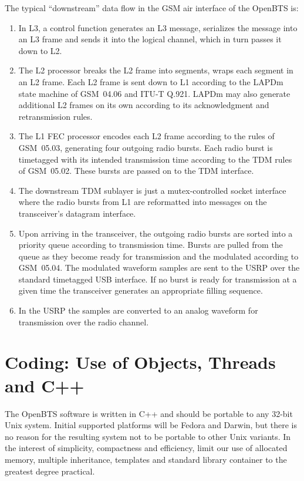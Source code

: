 \documentclass[11pt]{book}
\begin{document}
The typical ``downstream'' data flow in the GSM air interface of the OpenBTS is:
\begin{enumerate}
	\item In L3, a control function generates an L3 message, serializes the message into an L3 frame and sends it into the logical channel, which in turn passes it down to L2.
	\item The L2 processor breaks the L2 frame into segments, wraps each segment in an L2 frame.  Each L2 frame is sent down to L1 according to the LAPDm state machine of GSM~04.06 and ITU-T Q.921.  LAPDm may also generate additional L2 frames on its own according to its acknowledgment and retransmission rules.
	\item The L1 FEC processor encodes each L2 frame according to the rules of GSM~05.03, generating four outgoing radio bursts.  Each radio burst is timetagged with its intended transmission time according to the TDM rules of GSM~05.02.  These bursts are passed on to the TDM interface.
	\item The downstream TDM sublayer is just a mutex-controlled socket interface where the radio bursts from L1 are reformatted into messages on the transceiver's datagram interface.
	\item Upon arriving in the transceiver, the outgoing radio bursts are sorted into a priority queue according to transmission time.  Bursts are pulled from the queue as they become ready for transmission and the modulated according to GSM~05.04.  The modulated waveform samples are sent to the USRP over the standard timetagged USB interface.  If no burst is ready for transmission at a given time the transceiver generates an appropriate filling sequence.
	\item In the USRP the samples are converted to an analog waveform for transmission over the radio channel.
\end{enumerate}



\section{Coding: Use of Objects, Threads and C++}
The OpenBTS software is written in C++ and should be portable to any 32-bit Unix system.  Initial supported platforms will be Fedora and Darwin, but there is no reason for the resulting system not to be portable to other Unix variants.  In the interest of simplicity, compactness and efficiency,  limit our use of allocated memory, multiple inheritance, templates and standard library container to the greatest degree practical.
\end{document}
